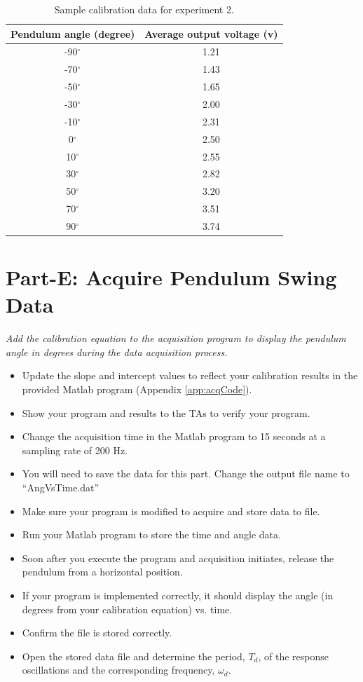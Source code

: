 \documentclass{article} %
\begin{document}
\begin{table}[!ht]
\centering
\caption{Sample calibration data for experiment 2.}
\begin{tabular}{c c}
\toprule
Pendulum angle (degree) & Average output voltage (v) \\ \hline
-90$^\circ$ & 1.21\\
-70$^\circ$ & 1.43\\
-50$^\circ$ & 1.65 \\
-30$^\circ$ & 2.00\\
-10$^\circ$ & 2.31\\
0$^\circ$  & 2.50\\
10$^\circ$ & 2.55\\
30$^\circ$ & 2.82\\
50$^\circ$ & 3.20\\
70$^\circ$ & 3.51\\
90$^\circ$ & 3.74\\
\bottomrule
\end{tabular}
\label{tab:Table01}
\end{table}

\section{Part-E: Acquire Pendulum Swing Data}
\emph{Add the calibration equation to the acquisition program to display the pendulum angle in degrees during the data acquisition process. }
\begin{itemize}
\item Update the slope and intercept values to reflect your calibration results in the provided Matlab program (Appendix \ref{app:acqCode}).
\item Show your program and results to the TAs to verify your program.
\item Change the acquisition time in the Matlab program to 15 seconds at a sampling rate of 200 Hz.
\item You will need to save the data for this part. Change the output file name to ``AngVsTime.dat''
\item Make sure your program is modified to acquire and store data to file.
\item Run your Matlab program to store the time and angle data.
\item Soon after you execute the program and acquisition initiates, release the pendulum from a horizontal position.
\item If your program is implemented correctly, it should display the angle (in degrees from your calibration equation) vs. time.
\item Confirm the file is stored correctly.
\item Open the stored data file and determine the period, $T_d$, of the response oscillations and the corresponding frequency, $\omega_d$.
\end{itemize}
\end{document}
